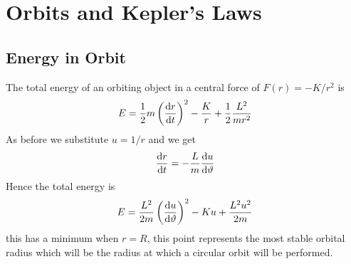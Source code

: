 \documentclass{article}
\begin{document}
    \section{Orbits and Kepler's Laws}
    \subsection{Energy in Orbit}
    The total energy of an orbiting object in a central force of \(F(r) = -K/r^2\) is
    \[E = \frac{1}{2}m\left(\dv{r}{t}\right)^2 - \frac{K}{r} + \frac{1}{2}\frac{L^2}{mr^2}\]
    As before we substitute \(u = 1/r\) and we get
    \[\dv{r}{t} = -\frac{L}{m}\dv{u}{\vartheta}\]
    Hence the total energy is
    \[E = \frac{L^2}{2m}\left(\dv{u}{\vartheta}\right)^2 - Ku + \frac{L^2u^2}{2m}\]
    this has a minimum when \(r = R\), this point represents the most stable orbital radius which will be the radius at which a circular orbit will be performed.
    
\end{document}
